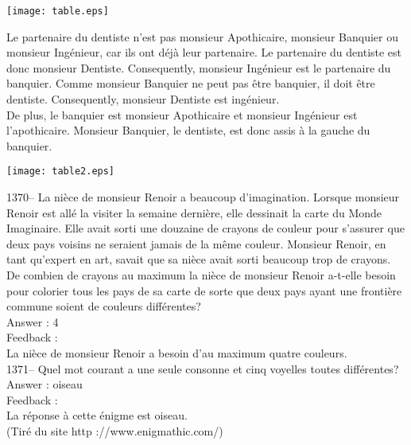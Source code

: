 ﻿\documentclass[letterpaper, 12pt]{article}
\begin{document}
    \begin{flushleft}
    \texttt{[image: table.eps]}
    \end{flushleft}

Le partenaire du dentiste n'est pas monsieur Apothicaire, monsieur Banquier
ou monsieur Ing\'enieur, car ils ont d\'ej\`a leur partenaire.  Le
partenaire du dentiste est donc monsieur Dentiste.  Consequently,
monsieur Ing\'enieur est le partenaire du banquier.  Comme monsieur Banquier
ne peut pas \^etre banquier, il doit \^etre dentiste.  Consequently,
monsieur Dentiste est ing\'enieur.  \\
De plus, le banquier est monsieur Apothicaire et monsieur Ing\'enieur est
l'apothicaire.  Monsieur Banquier, le dentiste, est donc assis \`a la gauche
du banquier.\\

    \begin{center}
    \texttt{[image: table2.eps]}
    \end{center}

1370-- La ni\`ece de monsieur Renoir a beaucoup d'imagination.
Lorsque monsieur Renoir est all\'e la visiter la semaine derni\`ere,
elle dessinait la carte du \og Monde Imaginaire\fg .  Elle avait
sorti une douzaine de crayons de couleur pour s'assurer que deux
pays voisins ne seraient jamais de la m\^eme couleur.  Monsieur
Renoir, en tant qu'expert en art, savait que sa ni\`ece avait sorti
beaucoup trop de crayons.  De combien de crayons au maximum la
ni\`ece de monsieur Renoir a-t-elle besoin pour colorier tous les
pays de sa carte de sorte que deux pays ayant une fronti\`ere
commune soient de
couleurs diff\'erentes?\\

Answer : 4\\

Feedback : \\
La ni\`ece de monsieur Renoir a besoin d'au maximum quatre couleurs.\\

1371-- Quel mot courant a une seule consonne et cinq voyelles toutes
diff\'erentes?\\

Answer : oiseau\\

Feedback : \\
La r\'eponse \`a cette \'enigme est oiseau.\\
(Tir\'e du site http ://www.enigmathic.com/)\\
\end{document}
